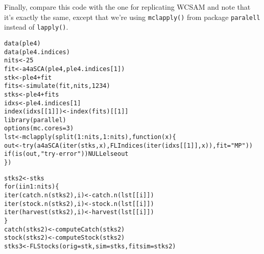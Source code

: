 \documentclass[a4paper,english,10pt]{article}\usepackage[]{graphicx}\usepackage[]{color}
\makeatletter
\newcommand{\hlnum}[1]{\textcolor[rgb]{0.2,0.2,0.2}{#1}}%
\newcommand{\hlstr}[1]{\textcolor[rgb]{0.2,0.2,0.2}{#1}}%
\newcommand{\hlopt}[1]{\textcolor[rgb]{0.2,0.2,0.2}{#1}}%
\newcommand{\hlstd}[1]{\textcolor[rgb]{0,0,0}{#1}}%
\newcommand{\hlkwa}[1]{\textcolor[rgb]{0.361,0.506,0.596}{#1}}%
\newcommand{\hlkwb}[1]{\textcolor[rgb]{0.361,0.506,0.596}{#1}}%
\newcommand{\hlkwc}[1]{\textcolor[rgb]{0.361,0.506,0.596}{#1}}%
\newcommand{\hlkwd}[1]{\textcolor[rgb]{0.361,0.506,0.596}{#1}}%
\newenvironment{kframe}{%
 \def\at@end@of@kframe{}%
 \ifinner\ifhmode%
  \def\at@end@of@kframe{\end{minipage}}%
  \begin{minipage}{\columnwidth}%
 \fi\fi%
 \def\FrameCommand##1{\hskip\@totalleftmargin \hskip-\fboxsep
 \colorbox{shadecolor}{##1}\hskip-\fboxsep
     \hskip-\linewidth \hskip-\@totalleftmargin \hskip\columnwidth}%
 \MakeFramed {\advance\hsize-\width
   \@totalleftmargin\z@ \linewidth\hsize
   \@setminipage}}%
 {\par\unskip\endMakeFramed%
 \at@end@of@kframe}
\newenvironment{knitrout}{}{} %
\newcommand{\code}[1]{{\texttt{#1}}}
\newcommand{\pkg}[1]{{\texttt{#1}}}
\makeatother
\begin{document}
Finally, compare this code with the one for replicating WCSAM and note that it's exactly the same, except that we're using \code{mclapply()} from package \pkg{paralell} instead of \code{lapply()}.

\begin{knitrout}
\color{fgcolor}\begin{kframe}
\begin{alltt}
\hlkwd{data}\hlstd{(ple4)}
\hlkwd{data}\hlstd{(ple4.indices)}
\hlstd{nits} \hlkwb{<-} \hlnum{25}
\hlstd{fit} \hlkwb{<-} \hlkwd{a4aSCA}\hlstd{(ple4, ple4.indices[}\hlnum{1}\hlstd{])}
\hlstd{stk} \hlkwb{<-} \hlstd{ple4} \hlopt{+} \hlstd{fit}
\hlstd{fits} \hlkwb{<-} \hlkwd{simulate}\hlstd{(fit, nits,} \hlnum{1234}\hlstd{)}
\hlstd{stks} \hlkwb{<-} \hlstd{ple4} \hlopt{+} \hlstd{fits}
\hlstd{idxs} \hlkwb{<-} \hlstd{ple4.indices[}\hlnum{1}\hlstd{]}
\hlkwd{index}\hlstd{(idxs[[}\hlnum{1}\hlstd{]])} \hlkwb{<-} \hlkwd{index}\hlstd{(fits)[[}\hlnum{1}\hlstd{]]}
\hlkwd{library}\hlstd{(parallel)}
\hlkwd{options}\hlstd{(}\hlkwc{mc.cores}\hlstd{=}\hlnum{3}\hlstd{)}
\hlstd{lst} \hlkwb{<-} \hlkwd{mclapply}\hlstd{(}\hlkwd{split}\hlstd{(}\hlnum{1}\hlopt{:}\hlstd{nits,} \hlnum{1}\hlopt{:}\hlstd{nits),} \hlkwa{function}\hlstd{(}\hlkwc{x}\hlstd{)\{}
        \hlstd{out} \hlkwb{<-} \hlkwd{try}\hlstd{(}\hlkwd{a4aSCA}\hlstd{(}\hlkwd{iter}\hlstd{(stks, x),} \hlkwd{FLIndices}\hlstd{(}\hlkwd{iter}\hlstd{(idxs[[}\hlnum{1}\hlstd{]], x)),} \hlkwc{fit}\hlstd{=}\hlstr{"MP"}\hlstd{))}
        \hlkwa{if}\hlstd{(}\hlkwd{is}\hlstd{(out,} \hlstr{"try-error"}\hlstd{))} \hlkwa{NULL else} \hlstd{out}
\hlstd{\})}

\hlstd{stks2} \hlkwb{<-} \hlstd{stks}
\hlkwa{for}\hlstd{(i} \hlkwa{in} \hlnum{1}\hlopt{:}\hlstd{nits)\{}
        \hlkwd{iter}\hlstd{(}\hlkwd{catch.n}\hlstd{(stks2), i)} \hlkwb{<-} \hlkwd{catch.n}\hlstd{(lst[[i]])}
        \hlkwd{iter}\hlstd{(}\hlkwd{stock.n}\hlstd{(stks2), i)} \hlkwb{<-} \hlkwd{stock.n}\hlstd{(lst[[i]])}
        \hlkwd{iter}\hlstd{(}\hlkwd{harvest}\hlstd{(stks2), i)} \hlkwb{<-} \hlkwd{harvest}\hlstd{(lst[[i]])}
\hlstd{\}}
\hlkwd{catch}\hlstd{(stks2)} \hlkwb{<-} \hlkwd{computeCatch}\hlstd{(stks2)}
\hlkwd{stock}\hlstd{(stks2)} \hlkwb{<-} \hlkwd{computeStock}\hlstd{(stks2)}
\hlstd{stks3} \hlkwb{<-} \hlkwd{FLStocks}\hlstd{(}\hlkwc{orig}\hlstd{=stk,} \hlkwc{sim}\hlstd{=stks,} \hlkwc{fitsim}\hlstd{=stks2)}
\end{alltt}
\end{kframe}
\end{knitrout}
\end{document}
